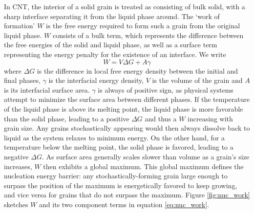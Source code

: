 In CNT, the interior of a solid grain is treated as consisting of bulk solid, with a sharp interface separating it from the liquid phase around. The `work of formation' $W$ is the free energy required to form such a grain from the original liquid phase. $W$ consists of a bulk term, which represents the difference between the free energies of the solid and liquid phase, as well as a surface term representing the energy penalty for the existence of an interface. We write
\begin{equation}\label{eq:nuc_work}
W = V\Delta G + A\gamma
\end{equation}
where $\Delta G$ is the difference in local free energy density between the initial and final phases, $\gamma$ is the interfacial energy density, $V$ is the volume of the grain and $A$ is its interfacial surface area. $\gamma$ is always of positive sign, as physical systems attempt to minimize the surface area between different phases. If the temperature of the liquid phase is above its melting point, the liquid phase is more favorable than the solid phase, leading to a positive $\Delta G$ and thus a $W$ increasing with grain size. Any grains stochastically appearing would then always dissolve back to liquid as the system relaxes to minimum energy. On the other hand, for a temperature below the melting point, the solid phase is favored, leading to a negative $\Delta G$. As surface area generally scales slower than volume as a grain's size increases, $W$ then exhibits a global maximum. This global maximum defines the nucleation energy barrier: any stochastically-forming grain large enough to surpass the position of the maximum is energetically favored to keep growing, and vice versa for grains that do not surpass the maximum. Figure \ref{fig:nuc_work} sketches $W$ and its two component terms in equation \ref{eq:nuc_work}.

